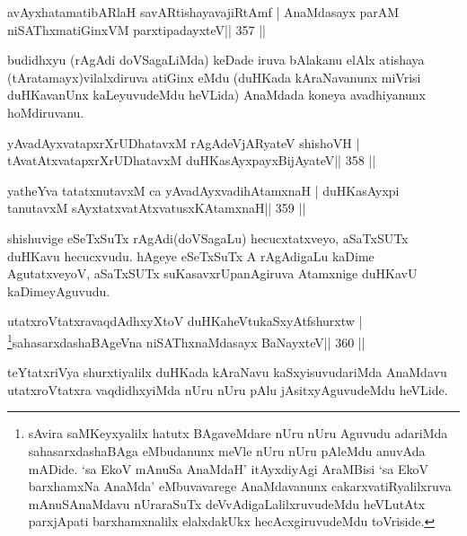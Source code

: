 \begin{shl}
avAyxhatamatibARlaH savARtishayavajiRtAmf |
AnaMdasayx parAM niSAThxmatiGinxVM parxtipadayxteV\hfill || 357 ||
\end{shl}

\begin{artha}
budidhxyu (rAgAdi doVSagaLiMda) keDade iruva bAlakanu elAlx atishaya (tAratamayx)vilalxdiruva atiGinx eMdu (duHKada kAraNavanunx miVrisi duHKavanUnx kaLeyuvudeMdu heVLida) AnaMdada koneya avadhiyanunx hoMdiruvanu.
\end{artha}


\begin{shl}
yAvadAyxvatapxrXrUDhatavxM rAgAdeVjARyateV shishoVH |
tAvatAtxvatapxrXrUDhatavxM duHKasAyxpayxBijAyateV\hfill || 358 ||
\end{shl}

\begin{shl}
yatheYva tatatxnutavxM ca yAvadAyxvadihA\s\s tamxnaH |
duHKasAyxpi tanutavxM sAyxtatxvatAtxvatusxKAtamxnaH\hfill || 359 ||
\end{shl}

\begin{artha}
shishuvige eSeTxSuTx rAgAdi(doVSagaLu) hecucxtatxveyo, aSaTxSUTx 
duHKavu hecucxvudu. hAgeye eSeTxSuTx A rAgAdigaLu kaDime AgutatxveyoV, 
aSaTxSUTx suKasavxrUpanAgiruva Atamxnige duHKavU kaDimeyAguvudu. 
\end{artha}



\begin{shl}
utatxroVtatxravaqdAdhxyX\s toV duHKaheVtukaSxyAtfshurxtw |
\footnote{sAvira saMKeyxyalilx hatutx BAgaveMdare nUru nUru  Aguvudu adariMda sahasarxdashaBAga eMbudanunx meVle nUru nUru pAleMdu  anuvAda mADide. `sa EkoV mAnuSa AnaMdaH' itAyxdiyAgi AraMBisi  `sa EkoV barxhamxNa AnaMda' eMbuvavarege AnaMdavanunx  cakarxvatiRyalilxruva mAnuSAnaMdavu nUraraSuTx deVvAdigaLalilxruvudeMdu heVLutAtx parxjApati barxhamxnalilx elalxdakUkx hecAcxgiruvudeMdu toVriside.}sahasarxdashaBAgeVna niSAThx\s\s naMdasayx BaNayxteV\hfill || 360 ||
\end{shl}

\begin{artha}
teYtatxriVya shurxtiyalilx duHKada kAraNavu kaSxyisuvudariMda AnaMdavu utatxroVtatxra vaqdidhxyiMda nUru nUru pAlu jAsitxyAguvudeMdu heVLide.
\end{artha}


